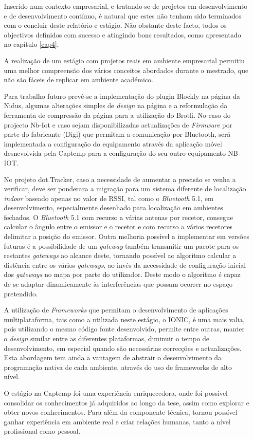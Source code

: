 \par Inserido num contexto empresarial, e tratando-se de projetos em desenvolvimento e de desenvolvimento contínuo, é natural que estes não tenham sido terminados com o concluir deste relatório e estágio. Não obstante deste facto, todos os objectivos definidos com sucesso e atingindo bons resultados, como apresentado no capítulo \ref{cap4}. 
\par A realização de um estágio com projetos reais em ambiente empresarial permitiu uma melhor compreensão dos vários conceitos abordados durante o mestrado, que não são fáceis de replicar em ambiente académico.

\par Para trabalho futuro prevê-se a implementação do plugin Blockly na página da Nidus, algumas alterações simples de \textit{design} na página e a reformulação da ferramenta de compressão da página para a utilização do Brotli.
No caso do projecto Nb-Iot e caso sejam disponibilizadas actualizações de \textit{Firmware} por parte do fabricante (Digi) que permitam a comunicação por Bluetooth, será implementada a configuração do equipamento através da aplicação móvel desnevolvida pela Captemp para a configuração do seu outro equipamento NB-IOT.
\par No projeto dot.Tracker, caso a necessidade de aumentar a precisão se venha a verificar, deve ser ponderara a migração para um sistema diferente de localização \textit{indoor} baseado apenas no valor de RSSI, tal como o \textit{Bluetooth} 5.1, em desenvolvimento, especialmente desenhado para localização em ambientes fechados. O \textit{Bluetooth} 5.1 com recurso a várias antenas por recetor, consegue calcular o ângulo entre o emissor e o recetor e com recurso a vários recetores delimitar a posição do emissor. Outra melhoria possível a implementar em versões futuras é a possibilidade de um \textit{gateway} também transmitir um pacote para os restantes \textit{gateways} ao alcance deste, tornando possível ao algoritmo calcular a distência entre os vários \textit{gateways}, ao invés da necessidade de configuração inicial dos \textit{gateways} no mapa por parte do utilizador. Deste modo o algoritmo é capaz de se adaptar dinamicamente às interferências que possam ocorrer no espaço pretendido.

\par A utilização de \textit{Frameworks} que permitam o desenvolvimento de aplicações multiplataforma, tais como a utilizada neste estágio, o IONIC, é uma mais valia, pois utilizando o mesmo código fonte desenvolvido, permite entre outras, manter o \textit{design} similar entre as diferentes plataformas, diminuir o tempo de desenvolvimento, em especial quando são necessárias correcções e actualizações.
Esta abordagem tem ainda a vantagem de abstrair o desenvolvimento da programação nativa de cada ambiente, através do uso de frameworks de alto nível.

\par O estágio na Captemp foi uma experiência enriquecedora, onde foi possível consolidar os conhecimentos já adquiridos ao longo da tese, assim como explorar e obter novos conhecimentos. Para além da componente técnica, tornou possível ganhar experiência em ambiente real e criar relações humanas, tanto a nível profissional como pessoal.
